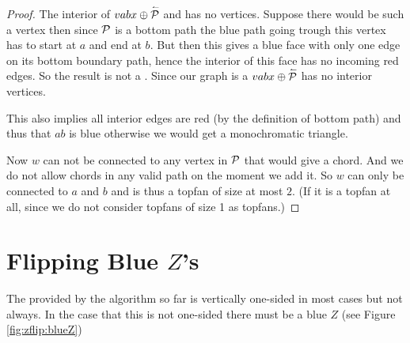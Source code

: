 \begin{proof}
      The interior of  $vabx \oplus \rev \P$ and has no vertices. Suppose there would be such a vertex then since $\P$ is a bottom path the blue path going trough this vertex has to start at $a$ and end at $b$. But then this gives a blue face with only one edge on its bottom boundary path, hence the interior of this face has no incoming red edges.  So the result is not a \rel. Since our graph is a \rel $vabx \oplus \rev \P$ has no interior vertices.

      This also implies all interior edges are red (by the definition of bottom path) and thus that $ab$ is blue otherwise we would get a monochromatic triangle.

      Now $w$ can not be connected to any vertex in $\P$ that would give a chord. And we do not allow chords in any valid path on the moment we add it. So $w$ can only be connected to $a$ and $b$ and is thus a topfan of size at most $2$. (If it is a topfan at all, since we do not consider topfans of size 1 as topfans.)
    \end{proof}

\newpage
\section{Flipping Blue $Z$'s}
\thispagestyle{plain}
    The \rel provided by the algorithm so far is vertically one-sided in most cases but not always. In the case that this \rel is not one-sided there must be a blue $Z$ (see Figure \ref{fig:zflip:blueZ})

